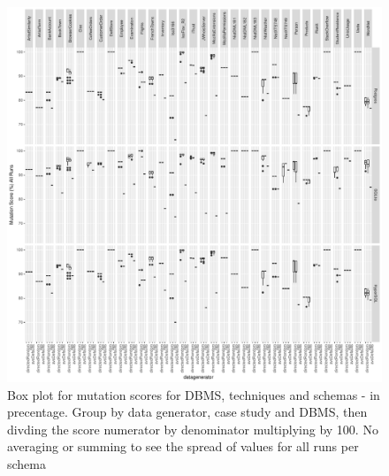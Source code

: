 \documentclass[runningheads,a4paper]{llncs}
\begin{document}
\begin{figure}[h]
\centering
\includegraphics[width=\linewidth]{../plots/figure8.pdf}
\caption{Box plot for mutation scores for DBMS, techniques and schemas -
in precentage. Group by data generator, case study and DBMS, then
divding the score numerator by denominator multiplying by 100. No
averaging or summing to see the spread of values for all runs per
schema}
\end{figure}
\end{document}
